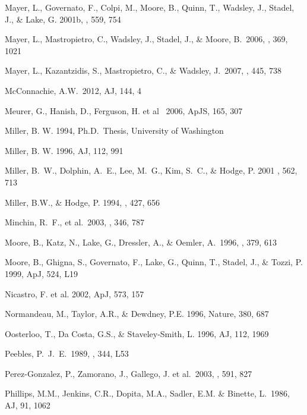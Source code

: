 \documentclass[12pt,preprint]{emulateapj}
\begin{document}
\begin{thebibliography}{}
Mayer, L., Governato, F., Colpi, M., Moore, B., Quinn, T., Wadsley, J., 
Stadel, J., \& Lake, G. 2001b, \apj, 559, 754 

Mayer, L., Mastropietro, C., Wadsley, J., Stadel, J., \& 
   Moore, B.\ 2006, \mnras, 369, 1021

Mayer, L., Kazantzidis, S., Mastropietro, C., \& Wadsley, J.\ 2007, \nat, 445, 738 

McConnachie, A.W.\ 2012, AJ, 144, 4 

Meurer, G., Hanish, D., Ferguson, H. et al \ 2006, ApJS, 165, 307 

Miller, B. W. 1994, Ph.D.\ Thesis, University of Washington

Miller, B. W. 1996, AJ, 112, 991 

Miller, B.~W., Dolphin, A.~E., Lee, M.~G., Kim, S.~C., \& Hodge, P. 2001
\apj , 562, 713

Miller, B.W., \& Hodge, P. 1994, \apj , 427, 656

Minchin, R.~F., et al.\ 2003, \mnras, 346, 787 

Moore, B., Katz, N., Lake, G., Dressler, A., \& Oemler, A.\ 1996, \nat, 379, 613 

Moore, B., Ghigna, S., Governato, F., Lake, G., Quinn, T., Stadel, J., \&
Tozzi, P. 1999, ApJ, 524, L19

Nicastro, F. et al. 2002, ApJ, 573, 157

Normandeau, M., Taylor, A.R., \& Dewdney, P.E. 1996, Nature, 380, 687

Oosterloo, T., Da Costa, G.S., \& Staveley-Smith, L. 1996, AJ, 112, 1969

Peebles, P.~J.~E.\ 1989, \apjl, 344, L53 

Perez-Gonzalez, P., Zamorano, J., Gallego, J. et al.\ 2003, \apj, 591, 827 

Phillips, M.M., Jenkins, C.R., Dopita, M.A., Sadler, E.M. \& Binette, L.\ 1986, AJ, 91, 1062


\end{thebibliography}
\end{document}
